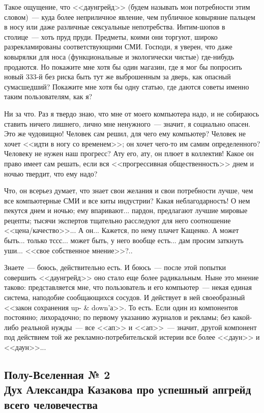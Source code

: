 \documentclass{scrbook}
\newcommand{\isAFourOneside}{\boolexpr{\value{bookformat} = \value{bfAFourOneside}}}
\newcommand{\isAFourTwoside}{\boolexpr{\value{bookformat} = \value{bfAFourTwoside}}}
\newcommand{\isAFour}{\boolexpr{\isAFourOneside \OR \isAFourTwoside}}
\newcommand{\flqq}{<<}
\newcommand{\frqq}{>>}
\newcommand{\mdash}{~--- }
\newcommand{\essaysection}[1]{\subsection*{#1}\nopagebreak}
\begin{document}
Такое ощущение, что {\flqq}даунгрейд{\frqq} (будем называть мои потребности этим словом){\mdash}куда более неприличное явление, чем публичное ковыряние пальцем в носу или даже различные сексуальные непотребства. Интим-шопов в столице{\mdash}хоть пруд пруди. Предметы, коими они торгуют, широко разрекламированы соответствующими СМИ. Господи, я уверен, что даже ковырялки для носа (функциональные и экологически чистые) где-нибудь продаются. Но покажите мне хотя бы один магазин, где я мог бы попросить новый 333-й без риска быть тут же выброшенным за дверь, как опасный сумасшедший? Покажите мне хотя бы одну статью, где даются советы именно таким пользователям, как я?

Ни за что. Раз я твердо знаю, что мне от моего компьютера надо, и не собираюсь ставить ничего лишнего, лично мне ненужного{\mdash}значит, я социально опасен. Это же чудовищно! Человек сам решил, для чего ему компьютер? Человек не хочет {\flqq}идти в ногу со временем{\frqq}; он хочет чего-то им самим определенного? Человеку не нужен наш прогресс? Ату его, ату, он плюет в коллектив! Какое он право имеет сам решать, если вся {\flqq}прогрессивная общественность{\frqq} днем и ночью твердит, что ему надо?

Что, он всерьез думает, что знает свои желания и свои потребности лучше, чем все компьютерные СМИ и все киты индустрии? Какая неблагодарность! О нем пекутся днем и ночью; ему впаривают... пардон, предлагают лучшие мировые рецепты; тысячи экспертов тщательно расследуют для него соотношение {\flqq}цена/качество{\frqq}... А он... Кажется, по нему плачет Кащенко. А может быть... только тссс... может быть, у него вообще есть... дам просим заткнуть уши... {\flqq}свое собственное мнение{\frqq}?..

Знаете{\mdash}боюсь, действительно есть. И боюсь{\mdash}после этой попытки совершить {\flqq}даунгрейд{\frqq} оно стало еще более радикальным. Ныне это мнение таково: представляется мне, что пользователь и его компьютер{\mdash}некая единая система, наподобие сообщающихся сосудов. И действует в ней своеобразный {\flqq}закон сохранения up- \& down'а{\frqq}. То есть.
Если один из компонентов постоянно; лихорадочно; по первому указанию журналов и рекламы; без какой-либо реальной нужды{\mdash}все {\flqq}ап{\frqq} и {\flqq}ап{\frqq}{\mdash}значит, другой компонент под действием той же рекламно-потребительской истерии все более {\flqq}даун{\frqq} и {\flqq}даун{\frqq}...

\ifcase\isAFour
	\pagebreak
\fi

\essaysection{Полу-Вселенная № 2 \\ Дух Александра Казакова про успешный апгрейд всего человечества}
\end{document}
